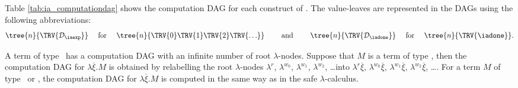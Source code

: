 Table \ref{tab:ia_computationdag} shows the computation DAG for each
construct of \ialgol. The value-leaves are represented in the DAGs
using the following abbreviations:
$$ \tree{n}{ \TRV{\mathcal{D}_\iaexp} }  \quad \mbox{ for }\quad
 \tree{n}{ \TRV{0} \TRV{1} \TRV{2} \TRV{\ldots} }
 \qquad \mbox{ and } \qquad
 \tree{n}{ \TRV{\mathcal{D}_\iadone} }  \quad \mbox{ for }\quad
 \tree{n}{ \TRV{\iadone }}.
$$

A term of type \iavar\ has a computation DAG with an infinite number
of root $\lambda$-nodes. Suppose that $M$ is a term of type \iavar,
then the computation DAG for $\lambda \overline{\xi} . M$ is
obtained by relabelling the root $\lambda$-nodes $\lambda^r$,
$\lambda^{w_0}$, $\lambda^{w_1}$, $\lambda^{w_2}$, \ldots into
$\lambda^r \overline{\xi}$, $\lambda^{w_0} \overline{\xi}$,
$\lambda^{w_1} \overline{\xi}$, $\lambda^{w_2} \overline{\xi}$,
\ldots. For a term $M$  of type \iaexp\ or \iacom, the computation
DAG for $\lambda \overline{\xi} . M$ is computed in the same way as
in the safe $\lambda$-calculus.

